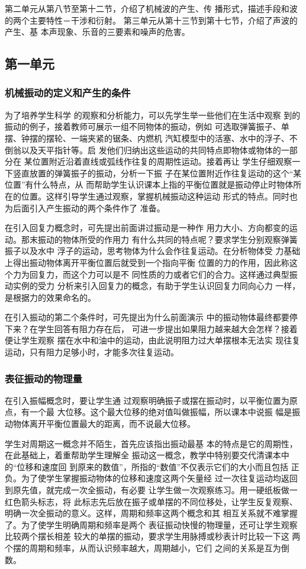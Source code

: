 第二单元从第八节至第十二节，介绍了机械波的产生、传
播形式，描述手段和波的两个主要特性－干涉和衍射。
第三单元从第十三节到第十七节，介绍了声波的产生、基
本声现象、乐音的三要素和噪声的危害。

\subsection{第一单元}
\subsubsection{机械振动的定义和产生的条件}

为了培养学生科学
的观察和分析能力，可以先学生举一些他们在生活中观察
到的振动的例子，接着教师可展示一组不同物体的振动，例如
可选取弹簧振子、单摆、钟摆的摆轮、一端夹紧的锯条、内燃机
汽缸模型中的活塞、水中的浮子、不倒翁以及天平指针等。启
发他们归纳出这些运动的共同特点即物体或物体的一部分在
某位置附近沿着直线或弧线作往复的周期性运动。接着再让
学生仔细观察一下竖直放置的弹簧振子的振动，分析一下振
子在某位置附近作往复运动的这个“某位置”有什么特点，从
而帮助学生认识课本上指的平衡位置就是振动停止时物体所
在的位置。这样引导学生通过观察，掌握机械振动这种运动
形式的特点。同时也为后面引入产生振动的两个条件作了
准备。

在引入回复力概念时，可先提出前面讲过振动是一种作
用力大小、方向都变的运动。那末振动的物体所受的作用力
有什么共同的特点呢？要求学生分别观察弹簧振子以及水中
浮子的运动，思考物体为什么会作往复运动。在分析物体受
力基础上得出振动物体离开平衡位置后就受到一个指向平衡
位置的力的作用，因此称这个力为回复力，而这个力可以是不
同性质的力或者它们的合力。这样通过典型振动实例的受力
分析来引入回复力的概念，有助于学生认识回复力同向心力
一样，是根据力的效果命名的。

在引入振动的第二个条件时，可先提出为什么前面演示
中的振动物体最终都要停下来？在学生回答有阻力存在后，
可进一步提出如果阻力越来越大会怎样？接着便让学生观察
摆在水中和油中的运动，由此说明阻力过大单摆根本无法实
现往复运动，只有阻力足够小时，才能多次往复运动。

\subsubsection{表征振动的物理量}
在引入振幅概念时，要让学生通
过观察明确振子或摆在振动时，以平衡位置为原点，有一个最
大位移。这个最大位移的绝对值叫做振幅，所以课本中说振
幅是振动物体离开平衡位置最大的距离，而不说最大位移。

学生对周期这一概念并不陌生，首先应该指出振动最基
本的特点是它的周期性，在此基础上，着重帮助学生理解全
振动这一概念，教学中特别要交代清课本中的“位移和速度回
到原来的数值”，所指的“数值”不仅表示它们的大小而且包括
正负。为了使学生掌握振动物体的位移和速度这两个矢量经
过一次往复运动均返回到原先值，就完成一次全振动，有必要
让学生做一次观察练习。用一硬纸板做一红色箭头标志，将
此标志先后放在振子或单摆的不同位移处，让学生反复观察、
明确一次全振动的意义。这样，周期和频率这两个概念和其
相互关系就不难掌握了。为了使学生明确周期和频率是两个
表征振动快慢的物理量，还可让学生观察比较两个摆长相差
较大的单摆的振动，要求学生用脉搏或秒表计时比较一下这
两个摆的周期和频率，从而认识频率越大，周期越小，它们
之间的关系是互为倒数。

